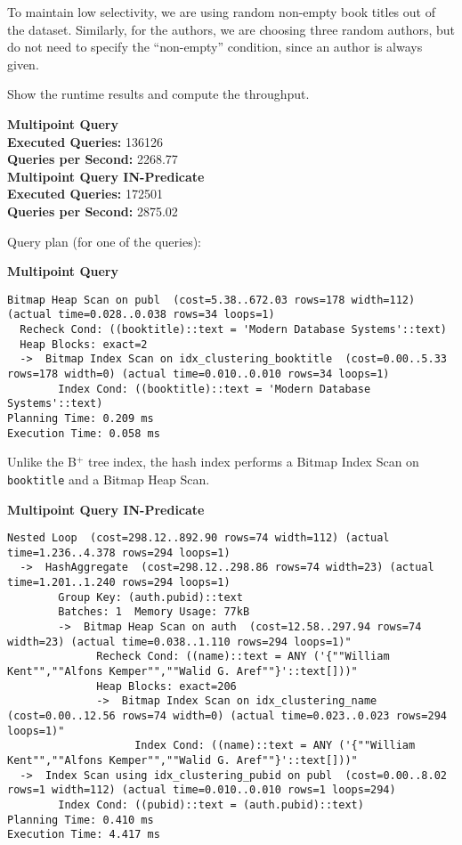 \documentclass[11pt]{scrartcl}
\begin{document}
To maintain low selectivity, we are using random non-empty book titles out of the dataset.
Similarly, for the authors, we are choosing three random authors, but do not need to specify the \enquote{non-empty}
condition, since an author is always given.

Show the runtime results and compute the throughput.

\textbf{Multipoint Query}\\
\textbf{Executed Queries: } 136126\\
\textbf{Queries per Second: } 2268.77\\

\textbf{Multipoint Query IN-Predicate}\\
\textbf{Executed Queries: } 172501\\
\textbf{Queries per Second: } 2875.02

Query plan (for one of the queries):

\textbf{Multipoint Query}
{\small
\parskip0pt\begin{verbatim}
Bitmap Heap Scan on publ  (cost=5.38..672.03 rows=178 width=112) (actual time=0.028..0.038 rows=34 loops=1)
  Recheck Cond: ((booktitle)::text = 'Modern Database Systems'::text)
  Heap Blocks: exact=2
  ->  Bitmap Index Scan on idx_clustering_booktitle  (cost=0.00..5.33 rows=178 width=0) (actual time=0.010..0.010 rows=34 loops=1)
        Index Cond: ((booktitle)::text = 'Modern Database Systems'::text)
Planning Time: 0.209 ms
Execution Time: 0.058 ms
\end{verbatim}}

Unlike the B$^+$ tree index, the hash index performs a Bitmap Index Scan on \texttt{booktitle} and a Bitmap Heap Scan.

\textbf{Multipoint Query IN-Predicate}
{\small
\parskip0pt\begin{verbatim}
Nested Loop  (cost=298.12..892.90 rows=74 width=112) (actual time=1.236..4.378 rows=294 loops=1)
  ->  HashAggregate  (cost=298.12..298.86 rows=74 width=23) (actual time=1.201..1.240 rows=294 loops=1)
        Group Key: (auth.pubid)::text
        Batches: 1  Memory Usage: 77kB
        ->  Bitmap Heap Scan on auth  (cost=12.58..297.94 rows=74 width=23) (actual time=0.038..1.110 rows=294 loops=1)"
              Recheck Cond: ((name)::text = ANY ('{""William Kent"",""Alfons Kemper"",""Walid G. Aref""}'::text[]))"
              Heap Blocks: exact=206
              ->  Bitmap Index Scan on idx_clustering_name  (cost=0.00..12.56 rows=74 width=0) (actual time=0.023..0.023 rows=294 loops=1)"
                    Index Cond: ((name)::text = ANY ('{""William Kent"",""Alfons Kemper"",""Walid G. Aref""}'::text[]))"
  ->  Index Scan using idx_clustering_pubid on publ  (cost=0.00..8.02 rows=1 width=112) (actual time=0.010..0.010 rows=1 loops=294)
        Index Cond: ((pubid)::text = (auth.pubid)::text)
Planning Time: 0.410 ms
Execution Time: 4.417 ms
\end{verbatim}}
\end{document}
